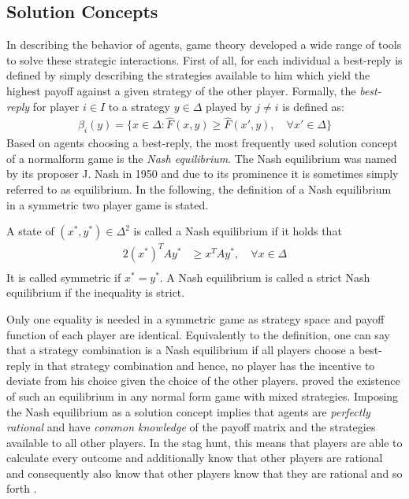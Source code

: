 \subsection{Solution Concepts}
\label{sec:traditionalconcepts}
In describing the behavior of agents, game theory developed a wide range of 
tools to solve these strategic interactions. First of all, for each individual
a best-reply is defined by simply describing the strategies available to him 
which yield the highest payoff against a given strategy of the other player.
Formally, the \textit{best-reply} for player $i \in I$ to a 
strategy $y \in \Delta$ played by $j \neq i$ is defined as:
\begin{align}
        \beta_i(y) = \{x \in \Delta: \hat{F}(x,y) \geq \hat{F}(x',y), 
        \quad \forall x' \in \Delta\}
\end{align}
Based on agents choosing a best-reply, the most frequently 
used solution concept of
a normalform game is the \textit{Nash equilibrium}.
The Nash equilibrium was named by its proposer J. Nash in 1950 
and due to its prominence it is sometimes simply referred to as equilibrium.
In the following, the definition of a Nash equilibrium in a symmetric two
player game is stated. 
\begin{mydef}
        \label{def:nashequilibrium}
        A state of $(x^*,y^*) \in \Delta^2$ is called a Nash equilibrium if 
        it holds that
        \begin{alignat*}{2}
                (x^*)^T A y^* &\geq x^T A y^*, \quad \forall x \in \Delta \\
        \end{alignat*}
It is called symmetric if $x^* = y^*$. A Nash equilibrium is called a 
strict Nash equilibrium if the inequality is strict.
\end{mydef}
Only one equality is needed in a symmetric game as strategy space and
payoff function of each player are identical.
Equivalently to the definition, one can say that a strategy combination 
is a Nash equilibrium if all players choose a best-reply in that strategy 
combination and hence, no player has the incentive to deviate from his 
choice given the choice of the other players.
\textcite{nash_equilibrium_1950} proved the existence of such 
an equilibrium in any normal form game with mixed strategies. 
Imposing the Nash equilibrium as a solution concept implies that 
agents are \textit{perfectly rational} and have \textit{common knowledge} 
of the payoff matrix and the strategies available to all other players. 
In the stag hunt, this means that players are able to calculate every
outcome and additionally know that other players are rational and 
consequently also know that other players know that 
they are rational and so forth \parencite{fudenberg_theory_1998}.


